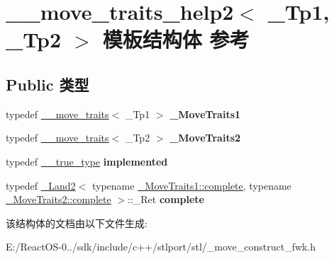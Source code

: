 \hypertarget{struct____move__traits__help2}{}\section{\+\_\+\+\_\+move\+\_\+traits\+\_\+help2$<$ \+\_\+\+Tp1, \+\_\+\+Tp2 $>$ 模板结构体 参考}
\label{struct____move__traits__help2}
\subsection*{Public 类型}
\begin{DoxyCompactItemize}
\item 
\mbox{\label{struct____move__traits__help2_ac6a674a2f93bcf34f458be71c509cc2e}} 
typedef \hyperlink{struct____move__traits}{\+\_\+\+\_\+move\+\_\+traits}$<$ \+\_\+\+Tp1 $>$ {\bfseries \+\_\+\+Move\+Traits1}
\item 
\mbox{\label{struct____move__traits__help2_a94013b7abb6d033cf4d9034acc898f5f}} 
typedef \hyperlink{struct____move__traits}{\+\_\+\+\_\+move\+\_\+traits}$<$ \+\_\+\+Tp2 $>$ {\bfseries \+\_\+\+Move\+Traits2}
\item 
\mbox{\label{struct____move__traits__help2_a5807bb43798c5a56cca045b0f1770b46}} 
typedef \hyperlink{struct____true__type}{\+\_\+\+\_\+true\+\_\+type} {\bfseries implemented}
\item 
\mbox{\label{struct____move__traits__help2_aec24288f2c28c8be09bc684e84c979a4}} 
typedef \hyperlink{struct___land2}{\+\_\+\+Land2}$<$ typename \hyperlink{struct____true__type}{\+\_\+\+Move\+Traits1\+::complete}, typename \hyperlink{struct____true__type}{\+\_\+\+Move\+Traits2\+::complete} $>$\+::\+\_\+\+Ret {\bfseries complete}
\end{DoxyCompactItemize}


该结构体的文档由以下文件生成\+:\begin{DoxyCompactItemize}
\item 
E\+:/\+React\+O\+S-\/0../sdk/include/c++/stlport/stl/\+\_\+move\+\_\+construct\+\_\+fwk.\+h\end{DoxyCompactItemize}
